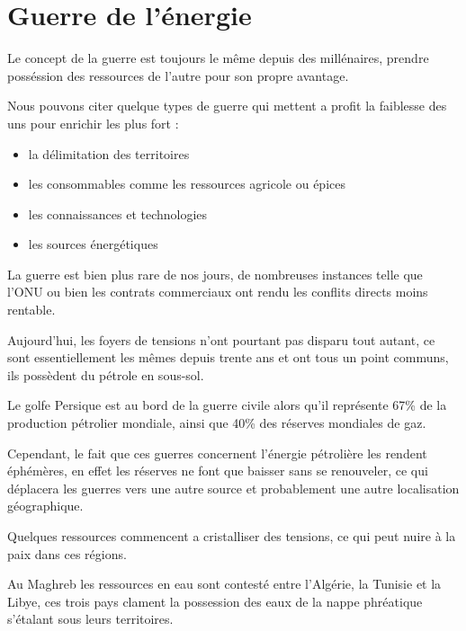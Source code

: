 \section{Guerre de l'énergie}

Le concept de la guerre est toujours le même depuis des millénaires, prendre posséssion des
ressources de l'autre pour son propre avantage.

Nous pouvons citer quelque types de guerre qui mettent a profit la faiblesse des uns
pour enrichir les plus fort :

\begin{itemize}
  \item la délimitation des territoires %
  \item les consommables comme les ressources agricole ou épices
  \item les connaissances et technologies
  \item les sources énergétiques
\end{itemize}

La guerre est bien plus rare de nos jours, de nombreuses instances telle que l'ONU ou bien les
contrats commerciaux ont rendu les conflits directs moins rentable.

Aujourd'hui, les foyers de tensions n’ont pourtant pas disparu tout autant,
ce sont essentiellement les mêmes depuis trente ans et ont tous un point communs,
ils possèdent du pétrole en sous-sol.

Le golfe Persique est au bord de la guerre civile alors qu'il représente 67\%
de la production pétrolier mondiale, ainsi que 40\% des réserves mondiales de gaz.

Cependant, le fait que ces guerres concernent l'énergie pétrolière les rendent éphémères,
en effet les réserves ne font que baisser sans se renouveler, ce qui déplacera les
guerres vers une autre source et probablement une autre localisation géographique.

Quelques ressources commencent a cristalliser des tensions, ce qui peut nuire à la paix
dans ces régions.

Au Maghreb les ressources en eau sont contesté entre l'Algérie, la Tunisie et la Libye, ces
trois pays clament la possession des eaux de la nappe phréatique s'étalant sous leurs
territoires.


